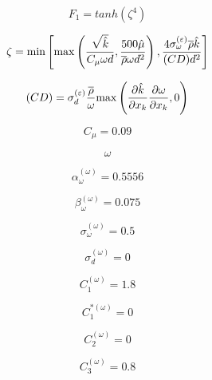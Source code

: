 \begin{equation}
F_1 = tanh(\zeta^4)
\end{equation}

\begin{equation}
\zeta = {\rm min} \left[ {\rm max} \left(
\frac{\sqrt{\hat k}}{C_{\mu} \omega d} , \frac{500 \hat \mu}{\overline \rho \omega d^2} \right) ,
\frac{4 \sigma_{\omega}^{(\varepsilon)}\overline \rho \hat k}
{(CD) d^2} \right]
\end{equation}

\begin{equation}
(CD) = \sigma_d^{(\varepsilon)} \frac{\overline \rho}{\omega}
{\rm max} \left( \frac{\partial \hat k}{\partial x_k}
\frac{\partial \omega}{\partial x_k}, 0 \right)
\end{equation}

\begin{equation}
C_{\mu} = 0.09
\end{equation}

\begin{equation}
\omega
\end{equation}

\begin{equation}
\alpha_{\omega}^{(\omega)} = 0.5556
\end{equation}

\begin{equation}
\beta_{\omega}^{(\omega)} = 0.075
\end{equation}

\begin{equation}
\sigma_{\omega}^{(\omega)} = 0.5
\end{equation}

\begin{equation}
\sigma_d^{(\omega)} = 0
\end{equation}

\begin{equation}
C_1^{(\omega)} = 1.8
\end{equation}

\begin{equation}
C_1^{*(\omega)} = 0
\end{equation}

\begin{equation}
C_2^{(\omega)} = 0
\end{equation}

\begin{equation}
C_3^{(\omega)} = 0.8
\end{equation}

